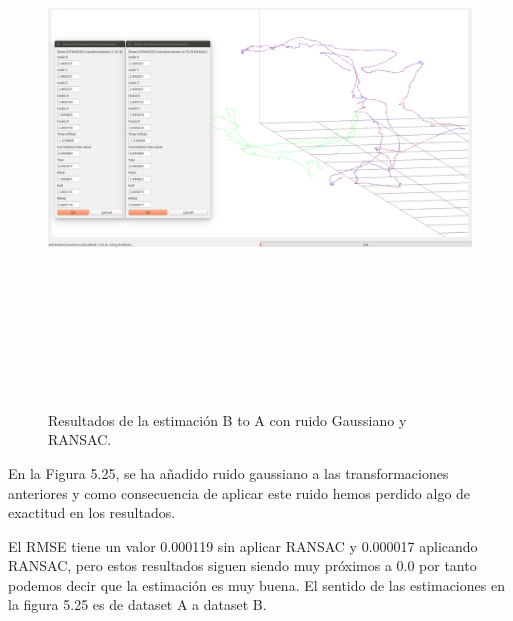 \begin{figure}[H]
\begin{center}
\label{fig:opciones de View}\includegraphics[height=14.0cm,width=18.0cm]{img/cap6/newData_EscalaTraslaRotaGauss_ab.png}
\hspace{0.5cm}

\end{center}


\caption{Resultados de la estimación B to A con ruido Gaussiano y  RANSAC.}
\end{figure}

En la Figura 5.25, se ha añadido ruido gaussiano a las transformaciones anteriores y como consecuencia de aplicar este ruido hemos perdido algo de exactitud en los resultados.

El RMSE tiene un valor 0.000119 sin aplicar RANSAC y 0.000017 aplicando RANSAC, pero estos resultados siguen siendo muy próximos a 0.0 por tanto podemos decir que la estimación es muy buena.
El sentido de las estimaciones en la figura 5.25 es de dataset A a dataset B.


